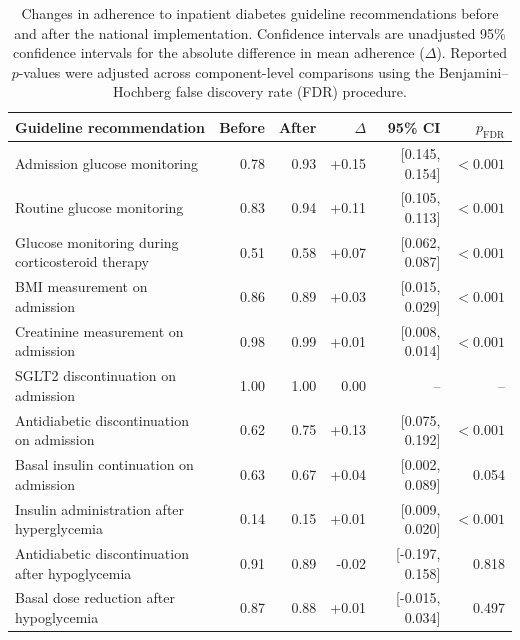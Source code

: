 \begin{table}[t]
\centering
\caption{Changes in adherence to inpatient diabetes guideline recommendations
before and after the national implementation. Confidence intervals are
unadjusted 95\% confidence intervals for the absolute difference in mean
adherence ($\Delta$). Reported $p$-values were adjusted across component-level
comparisons using the Benjamini--Hochberg false discovery rate (FDR)
procedure.}
\label{tab:adherence-change}

\small

\begin{tabularx}{\textwidth}{
>{\raggedright\arraybackslash}X
rrrrr
}
\toprule
Guideline recommendation & Before & After & $\Delta$ & 95\% CI & $p_{\mathrm{FDR}}$ \\
\midrule

Admission glucose monitoring
    & 0.78 & 0.93 & +0.15 & [0.145, 0.154] & $<0.001$ \\

Routine glucose monitoring
    & 0.83 & 0.94 & +0.11 & [0.105, 0.113] & $<0.001$ \\

Glucose monitoring during corticosteroid therapy
    & 0.51 & 0.58 & +0.07 & [0.062, 0.087] & $<0.001$ \\

BMI measurement on admission
    & 0.86 & 0.89 & +0.03 & [0.015, 0.029] & $<0.001$ \\

Creatinine measurement on admission
    & 0.98 & 0.99 & +0.01 & [0.008, 0.014] & $<0.001$ \\

SGLT2 discontinuation on admission
    & 1.00 & 1.00 & 0.00 & -- & -- \\

Antidiabetic discontinuation on admission
    & 0.62 & 0.75 & +0.13 & [0.075, 0.192] & $<0.001$ \\

Basal insulin continuation on admission
    & 0.63 & 0.67 & +0.04 & [0.002, 0.089] & 0.054 \\

Insulin administration after hyperglycemia
    & 0.14 & 0.15 & +0.01 & [0.009, 0.020] & $<0.001$ \\

Antidiabetic discontinuation after hypoglycemia
    & 0.91 & 0.89 & -0.02 & [-0.197, 0.158] & 0.818 \\

Basal dose reduction after hypoglycemia
    & 0.87 & 0.88 & +0.01 & [-0.015, 0.034] & 0.497 \\


\end{tabularx}
\end{table}
